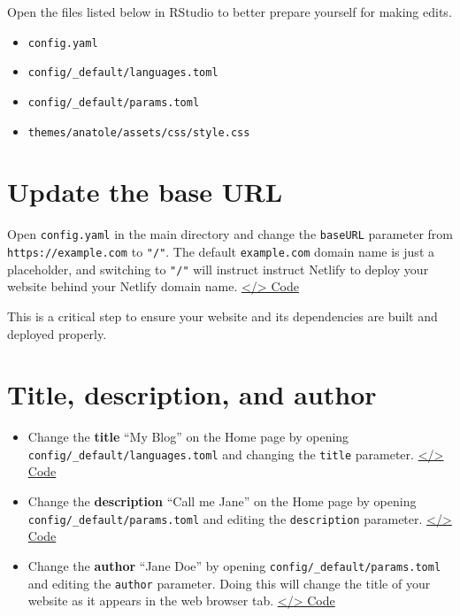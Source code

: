 \documentclass[
]{book}
\providecommand{\tightlist}{%
  \setlength{\itemsep}{0pt}\setlength{\parskip}{0pt}}
\begin{document}
Open the files listed below in RStudio to better prepare yourself for making edits.

\begin{itemize}
\tightlist
\item
  \texttt{config.yaml}
\item
  \texttt{config/\_default/languages.toml}
\item
  \texttt{config/\_default/params.toml}
\item
  \texttt{themes/anatole/assets/css/style.css}
\end{itemize}

\hypertarget{update-the-base-url}{%
\section{Update the base URL}\label{update-the-base-url}}

Open \texttt{config.yaml} in the main directory and change the \texttt{baseURL} parameter from \texttt{https://example.com} to \texttt{"/"}. The default \texttt{example.com} domain name is just a placeholder, and switching to \texttt{"/"} will instruct instruct Netlify to deploy your website behind your Netlify domain name. \href{https://github.com/dannymorris/r4sites-anatole-custom/blob/master/config.yaml\#L1}{\textless/\textgreater{} Code}

This is a critical step to ensure your website and its dependencies are built and deployed properly.

\hypertarget{title-description-and-author}{%
\section{Title, description, and author}\label{title-description-and-author}}

\begin{itemize}
\item
  Change the \textbf{title} ``My Blog'' on the Home page by opening \texttt{config/\_default/languages.toml} and changing the \texttt{title} parameter. \href{https://github.com/dannymorris/r4sites-anatole-custom/blob/master/config/_default/languages.toml\#L2}{\textless/\textgreater{} Code}
\item
  Change the \textbf{description} ``Call me Jane'' on the Home page by opening \texttt{config/\_default/params.toml} and editing the \texttt{description} parameter. \href{https://github.com/dannymorris/r4sites-anatole-custom/blob/master/config/_default/params.toml\#L5}{\textless/\textgreater{} Code}
\item
  Change the \textbf{author} ``Jane Doe'' by opening \texttt{config/\_default/params.toml} and editing the \texttt{author} parameter. Doing this will change the title of your website as it appears in the web browser tab. \href{https://github.com/dannymorris/r4sites-anatole-custom/blob/master/config/_default/params.toml\#L3}{\textless/\textgreater{} Code}
\end{itemize}
\end{document}
